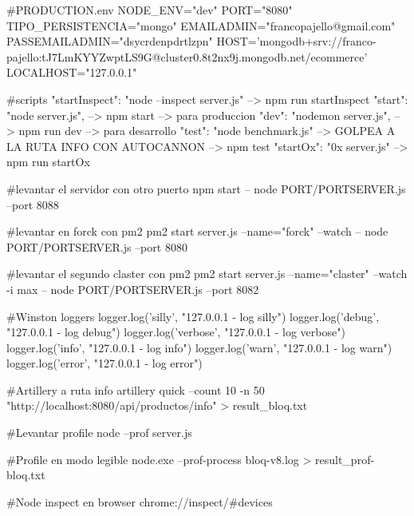 #PRODUCTION.env
    NODE_ENV="dev" 
    PORT="8080"
    TIPO_PERSISTENCIA="mongo"
    EMAILADMIN="francopajello@gmail.com"
    PASSEMAILADMIN="dsycrdenpdrtlzpn"
    HOST='mongodb+srv://franco-pajello:tJ7LmKYYZwptLS9G@cluster0.8t2nx9j.mongodb.net/ecommerce'
    LOCALHOST="127.0.0.1"

#scripts
    "startInspect": "node --inspect server.js"    --> npm run startInspect
    "start": "node server.js",                    --> npm start -->  para produccion
    "dev": "nodemon server.js",                   --> npm run dev --> para desarrollo
    "test": "node benchmark.js"                   --> GOLPEA A LA RUTA INFO CON AUTOCANNON --> npm test
    "startOx": "0x server.js"                     --> npm run startOx

#levantar el servidor con otro puerto
    npm start -- node PORT/PORTSERVER.js --port 8088

#levantar en forck con pm2 
    pm2 start server.js --name="forck" --watch -- node PORT/PORTSERVER.js --port 8080

#levantar el segundo claster con pm2 
    pm2 start server.js --name="claster" --watch -i max -- node PORT/PORTSERVER.js --port 8082

#Winston loggers
    logger.log('silly', "127.0.0.1 - log silly")
    logger.log('debug', "127.0.0.1 - log debug")
    logger.log('verbose', "127.0.0.1 - log verbose")
    logger.log('info', "127.0.0.1 - log info")
    logger.log('warn', "127.0.0.1 - log warn")
    logger.log('error', "127.0.0.1 - log error")

#Artillery a ruta info
    artillery quick --count 10 -n 50 "http://localhost:8080/api/productos/info" > result_bloq.txt

#Levantar profile
    node --prof server.js

#Profile en modo legible
    node.exe --prof-process bloq-v8.log > result_prof-bloq.txt

#Node inspect en browser
    chrome://inspect/#devices

